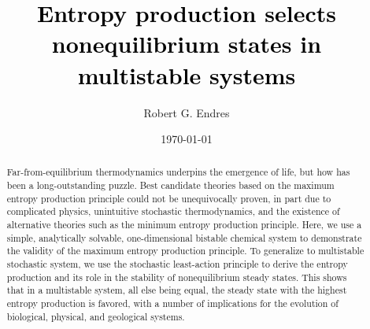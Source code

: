 \documentclass[aps,prl,reprint,singlecolumn,superscriptaddress]{revtex4}
\begin{document}

\title{\textcolor{black}{Entropy production selects nonequilibrium states in multistable systems}}


\author{Robert G. Endres}

\date{\today}

\begin{abstract}
Far-from-equilibrium thermodynamics underpins the emergence of life, but how has been a long-outstanding puzzle. Best
candidate theories based on the maximum entropy production principle could not be unequivocally proven, in part due
to complicated physics, unintuitive stochastic thermodynamics, and the existence of alternative theories such as the 
minimum entropy production principle. Here, we use a simple, analytically solvable, one-dimensional bistable chemical system 
to demonstrate the validity of the maximum entropy production principle. 
To generalize to multistable stochastic system, we use the stochastic least-action principle  
to derive the entropy production and its role in the stability of nonequilibrium steady states. 
This shows that in a multistable system, all else being equal, the steady state with the highest entropy production is favored, 
with a number of implications for the evolution of biological, physical, and geological systems.

\end{abstract}



\maketitle
\end{document}
